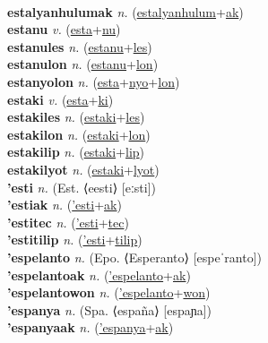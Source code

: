 \label{estalyanhulum} \\
\textbf{estalyanhulumak} \textit{n.} (\hyperref[estalyanhulum]{estalyanhulum}+\hyperref[ak]{ak})
 \label{estalyanhulumak} \\
\textbf{estanu} \textit{v.} (\hyperref[esta]{esta}+\hyperref[nu]{nu})
 \label{estanu} \\
\textbf{estanules} \textit{n.} (\hyperref[estanu]{estanu}+\hyperref[les]{les})
 \label{estanules} \\
\textbf{estanulon} \textit{n.} (\hyperref[estanu]{estanu}+\hyperref[lon]{lon})
 \label{estanulon} \\
\textbf{estanyolon} \textit{n.} (\hyperref[esta]{esta}+\hyperref[nyo]{nyo}+\hyperref[lon]{lon})
 \label{estanyolon} \\
\textbf{estaki} \textit{v.} (\hyperref[esta]{esta}+\hyperref[ki]{ki})
 \label{estaki} \\
\textbf{estakiles} \textit{n.} (\hyperref[estaki]{estaki}+\hyperref[les]{les})
 \label{estakiles} \\
\textbf{estakilon} \textit{n.} (\hyperref[estaki]{estaki}+\hyperref[lon]{lon})
 \label{estakilon} \\
\textbf{estakilip} \textit{n.} (\hyperref[estaki]{estaki}+\hyperref[lip]{lip})
 \label{estakilip} \\
\textbf{estakilyot} \textit{n.} (\hyperref[estaki]{estaki}+\hyperref[lyot]{lyot})
 \label{estakilyot} \\
\textbf{'esti} \textit{n.} (Est. ⟨eesti⟩ [eːsti])
 \label{'esti} \\
\textbf{'estiak} \textit{n.} (\hyperref['esti]{'esti}+\hyperref[ak]{ak})
 \label{'estiak} \\
\textbf{'estitec} \textit{n.} (\hyperref['esti]{'esti}+\hyperref[tec]{tec})
 \label{'estitec} \\
\textbf{'estitilip} \textit{n.} (\hyperref['esti]{'esti}+\hyperref[tilip]{tilip})
 \label{'estitilip} \\
\textbf{'espelanto} \textit{n.} (Epo. ⟨Esperanto⟩ [espeˈranto])
 \label{'espelanto} \\
\textbf{'espelantoak} \textit{n.} (\hyperref['espelanto]{'espelanto}+\hyperref[ak]{ak})
 \label{'espelantoak} \\
\textbf{'espelantowon} \textit{n.} (\hyperref['espelanto]{'espelanto}+\hyperref[won]{won})
 \label{'espelantowon} \\
\textbf{'espanya} \textit{n.} (Spa. ⟨españa⟩ [espaɲa])
 \label{'espanya} \\
\textbf{'espanyaak} \textit{n.} (\hyperref['espanya]{'espanya}+\hyperref[ak]{ak})
